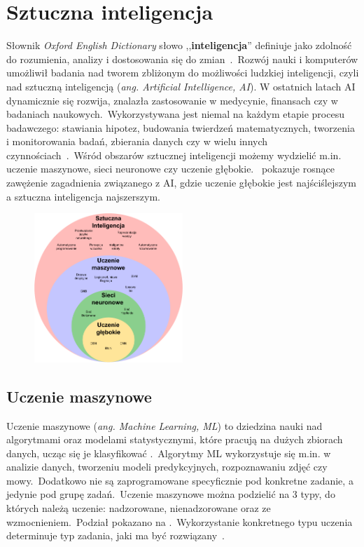 \chapter{Sztuczna inteligencja}
Słownik \textit{Oxford English Dictionary} słowo ,,\textbf{inteligencja}'' definiuje jako zdolność do rozumienia, analizy i dostosowania się do zmian~\cite{OxfordJuly2023}.\ Rozwój nauki i komputerów umożliwił badania nad tworem zbliżonym do możliwości ludzkiej inteligencji, czyli nad sztuczną inteligencją (\textit{ang. Artificial Intelligence, AI}). W ostatnich latach AI dynamicznie się rozwija, znalazła zastosowanie w medycynie, finansach czy w badaniach naukowych.\ Wykorzystywana jest niemal na każdym etapie procesu badawczego: stawiania hipotez, budowania twierdzeń matematycznych, tworzenia i monitorowania badań, zbierania danych czy w wielu innych czynnościach~\cite{AiScience, Mahesh2018}.\ Wśród obszarów sztucznej inteligencji możemy wydzielić m.in. uczenie maszynowe, sieci neuronowe czy uczenie głębokie.\  pokazuje rosnące zawężenie zagadnienia związanego z AI, gdzie uczenie głębokie jest najściślejszym a sztuczna inteligencja najszerszym.

\begin{figure}[H]
    \centering
    \includegraphics[width=0.5\textwidth]{images/si}
    \label{fig:si-schema}
\end{figure}


\section{Uczenie maszynowe}
Uczenie maszynowe (\textit {ang. Machine Learning, ML}) to dziedzina nauki nad algorytmami oraz modelami statystycznymi, które pracują na dużych zbiorach danych, ucząc się je klasyfikować .\ Algorytmy ML wykorzystuje się m.in. w analizie danych, tworzeniu modeli predykcyjnych, rozpoznawaniu zdjęć czy mowy.\ Dodatkowo nie są zaprogramowane specyficznie pod konkretne zadanie, a jedynie pod grupę zadań.\ Uczenie maszynowe można podzielić na 3 typy, do których należą uczenie: nadzorowane, nienadzorowane oraz ze wzmocnieniem.\ Podział  pokazano na .\ Wykorzystanie konkretnego typu uczenia determinuje typ zadania, jaki ma być rozwiązany~\cite{Mahesh2018, LinkedInSi}.


